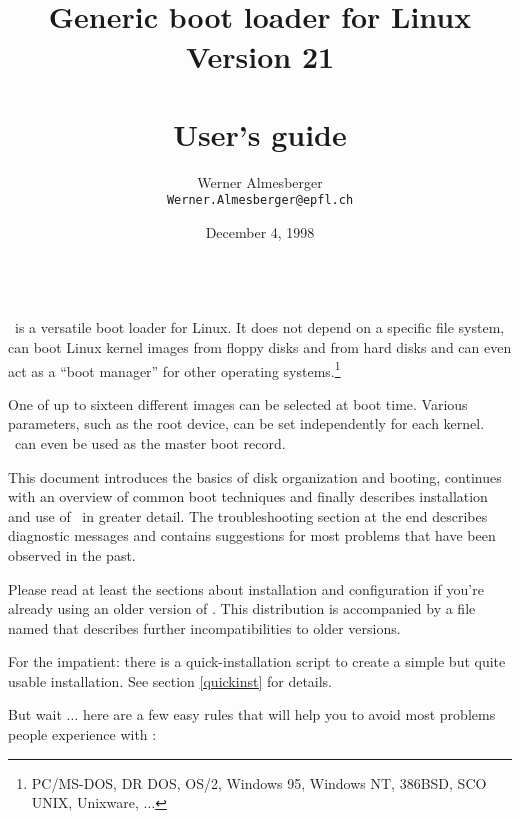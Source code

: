 \title{\LILO \\
  \Large
  Generic boot loader for Linux \\
  Version 21 \\ ~\\
  \bf User's guide}
\author{Werner Almesberger \\
  {\tt Werner.Almesberger@epfl.ch}}
\date{December 4, 1998}

\maketitle
{
  \parskip=-1pt
  \setcounter{tocdepth}{2}
  \tableofcontents
}

~\\
\LILO\ is a versatile boot loader for Linux. It does not depend on a specific
file system, can boot Linux kernel images from
floppy disks and from hard disks and can even act as a ``boot manager'' for
other operating
systems.\footnote{PC/MS-DOS, DR DOS, OS/2, Windows 95, Windows NT, 386BSD,
SCO UNIX, Unixware, $\ldots$}

One of up to sixteen different images can be selected at boot time.
Various parameters, such as the root
device, can be set independently for each kernel. \LILO\ can even be
used as the master boot record.

This document introduces the basics of disk organization and booting,
continues with an overview of common boot techniques and finally describes
installation and use of \LILO\ in greater detail. The troubleshooting
section at the end describes diagnostic messages and contains suggestions
for most problems that have been observed in the past.

Please read at least the sections about installation and configuration if
you're already using an older version of \LILO. This distribution is
accompanied by a file named  that describes further
incompatibilities to older versions.

For the impatient: there is a quick-installation script to create
a simple but quite usable installation. See section \ref{quickinst} for
details.

But wait $\ldots$ here are a few easy rules that will help you to avoid
most problems people experience with \LILO:

